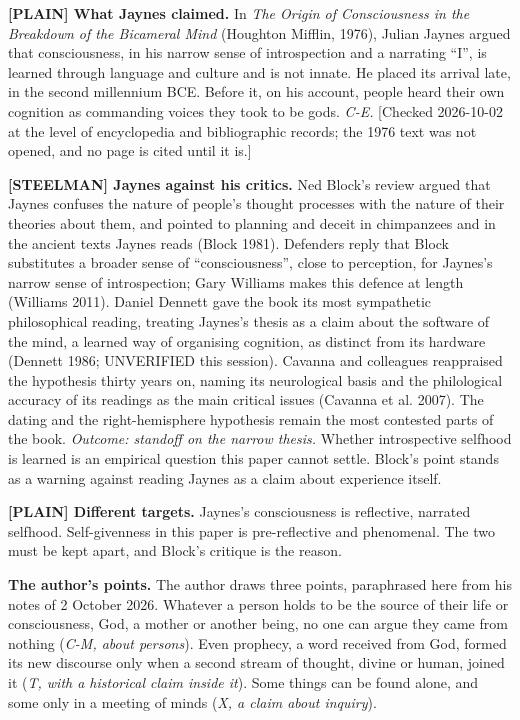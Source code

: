 \documentclass[11pt]{article}
\newcommand{\register}[1]{{\ttfamily\small #1}}
\begin{document}
\textbf{\register{[PLAIN]} What Jaynes claimed.} In \emph{The Origin of Consciousness in the Breakdown of the Bicameral Mind} (Houghton Mifflin, 1976), Julian Jaynes argued that consciousness, in his narrow sense of introspection and a narrating ``I'', is learned through language and culture and is not innate. He placed its arrival late, in the second millennium BCE. Before it, on his account, people heard their own cognition as commanding voices they took to be gods. \emph{C-E.} [Checked 2026-10-02 at the level of encyclopedia and bibliographic records; the 1976 text was not opened, and no page is cited until it is.]

\textbf{\register{[STEELMAN]} Jaynes against his critics.} Ned Block's review argued that Jaynes confuses the nature of people's thought processes with the nature of their theories about them, and pointed to planning and deceit in chimpanzees and in the ancient texts Jaynes reads (Block 1981). Defenders reply that Block substitutes a broader sense of ``consciousness'', close to perception, for Jaynes's narrow sense of introspection; Gary Williams makes this defence at length (Williams 2011). Daniel Dennett gave the book its most sympathetic philosophical reading, treating Jaynes's thesis as a claim about the software of the mind, a learned way of organising cognition, as distinct from its hardware (Dennett 1986; UNVERIFIED this session). Cavanna and colleagues reappraised the hypothesis thirty years on, naming its neurological basis and the philological accuracy of its readings as the main critical issues (Cavanna et al. 2007). The dating and the right-hemisphere hypothesis remain the most contested parts of the book. \emph{Outcome: standoff on the narrow thesis.} Whether introspective selfhood is learned is an empirical question this paper cannot settle. Block's point stands as a warning against reading Jaynes as a claim about experience itself.

\textbf{\register{[PLAIN]} Different targets.} Jaynes's consciousness is reflective, narrated selfhood. Self-givenness in this paper is pre-reflective and phenomenal. The two must be kept apart, and Block's critique is the reason.

\textbf{The author's points.} The author draws three points, paraphrased here from his notes of 2 October 2026. Whatever a person holds to be the source of their life or consciousness, God, a mother or another being, no one can argue they came from nothing (\emph{C-M, about persons}). Even prophecy, a word received from God, formed its new discourse only when a second stream of thought, divine or human, joined it (\emph{T, with a historical claim inside it}). Some things can be found alone, and some only in a meeting of minds (\emph{X, a claim about inquiry}).
\end{document}
